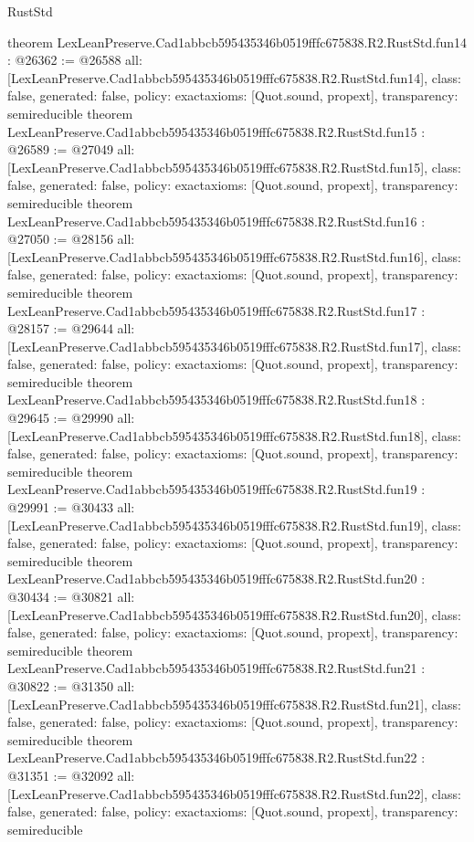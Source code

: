 \begin{lexlean}{RustStd}
\begin{coremodule}
{}
theorem LexLeanPreserve.Cad1abbcb595435346b0519fffc675838.R2.RustStd.fun14 : @26362 := @26588 {
  all: [LexLeanPreserve.Cad1abbcb595435346b0519fffc675838.R2.RustStd.fun14],
  class: false,
  generated: false,
  policy: exact{axioms: [Quot.sound, propext]},
  transparency: semireducible
}
theorem LexLeanPreserve.Cad1abbcb595435346b0519fffc675838.R2.RustStd.fun15 : @26589 := @27049 {
  all: [LexLeanPreserve.Cad1abbcb595435346b0519fffc675838.R2.RustStd.fun15],
  class: false,
  generated: false,
  policy: exact{axioms: [Quot.sound, propext]},
  transparency: semireducible
}
theorem LexLeanPreserve.Cad1abbcb595435346b0519fffc675838.R2.RustStd.fun16 : @27050 := @28156 {
  all: [LexLeanPreserve.Cad1abbcb595435346b0519fffc675838.R2.RustStd.fun16],
  class: false,
  generated: false,
  policy: exact{axioms: [Quot.sound, propext]},
  transparency: semireducible
}
theorem LexLeanPreserve.Cad1abbcb595435346b0519fffc675838.R2.RustStd.fun17 : @28157 := @29644 {
  all: [LexLeanPreserve.Cad1abbcb595435346b0519fffc675838.R2.RustStd.fun17],
  class: false,
  generated: false,
  policy: exact{axioms: [Quot.sound, propext]},
  transparency: semireducible
}
theorem LexLeanPreserve.Cad1abbcb595435346b0519fffc675838.R2.RustStd.fun18 : @29645 := @29990 {
  all: [LexLeanPreserve.Cad1abbcb595435346b0519fffc675838.R2.RustStd.fun18],
  class: false,
  generated: false,
  policy: exact{axioms: [Quot.sound, propext]},
  transparency: semireducible
}
theorem LexLeanPreserve.Cad1abbcb595435346b0519fffc675838.R2.RustStd.fun19 : @29991 := @30433 {
  all: [LexLeanPreserve.Cad1abbcb595435346b0519fffc675838.R2.RustStd.fun19],
  class: false,
  generated: false,
  policy: exact{axioms: [Quot.sound, propext]},
  transparency: semireducible
}
theorem LexLeanPreserve.Cad1abbcb595435346b0519fffc675838.R2.RustStd.fun20 : @30434 := @30821 {
  all: [LexLeanPreserve.Cad1abbcb595435346b0519fffc675838.R2.RustStd.fun20],
  class: false,
  generated: false,
  policy: exact{axioms: [Quot.sound, propext]},
  transparency: semireducible
}
theorem LexLeanPreserve.Cad1abbcb595435346b0519fffc675838.R2.RustStd.fun21 : @30822 := @31350 {
  all: [LexLeanPreserve.Cad1abbcb595435346b0519fffc675838.R2.RustStd.fun21],
  class: false,
  generated: false,
  policy: exact{axioms: [Quot.sound, propext]},
  transparency: semireducible
}
theorem LexLeanPreserve.Cad1abbcb595435346b0519fffc675838.R2.RustStd.fun22 : @31351 := @32092 {
  all: [LexLeanPreserve.Cad1abbcb595435346b0519fffc675838.R2.RustStd.fun22],
  class: false,
  generated: false,
  policy: exact{axioms: [Quot.sound, propext]},
  transparency: semireducible
}
\end{coremodule}
\end{lexlean}
